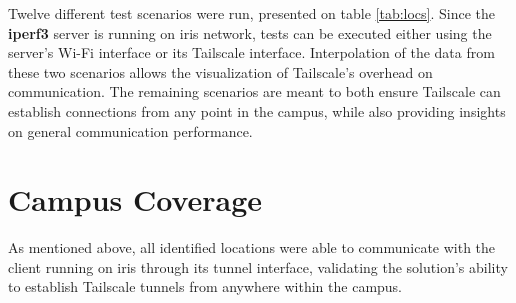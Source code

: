 \documentclass[11pt,twoside,a4paper]{report}
\begin{document}
Twelve different test scenarios were run, presented on table \ref{tab:locs}. Since the \textbf{iperf3} server is running on \ac{iris} network, tests can be executed either using the server's Wi-Fi interface or its Tailscale interface. Interpolation of the data from these two scenarios allows the visualization of Tailscale's overhead on communication. The remaining scenarios are meant to both ensure Tailscale can establish connections from any point in the campus, while also providing insights on general communication performance.

\section{Campus Coverage}

As mentioned above, all identified locations were able to communicate with the client running on \ac{iris} through its tunnel interface, validating the solution's ability to establish Tailscale tunnels from anywhere within the campus.
\end{document}
